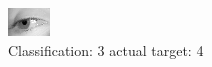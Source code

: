 \begin{figure}[h!]
\begin{center}
\includegraphics[width=0.60\columnwidth]{figures/ID2911_class_3_target_4.png}
\end{center}
\caption{ Classification: 3 actual target: 4}
\label{fig:ID2911_class_3_target_4}
\end{figure}
